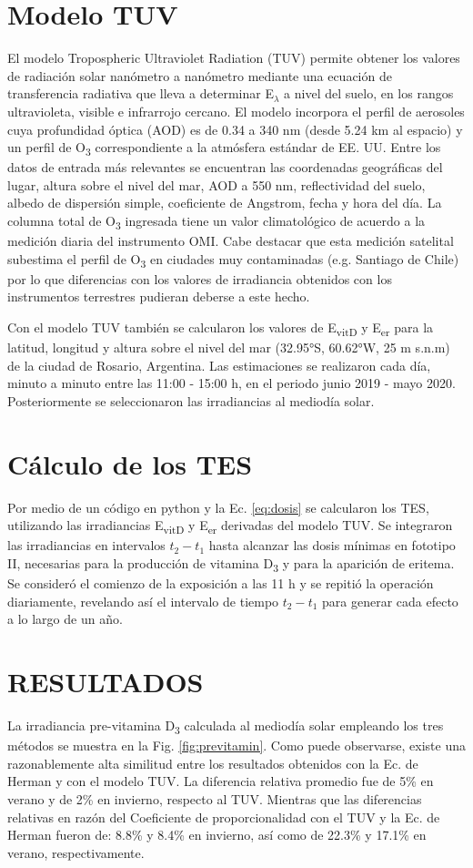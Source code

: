 \documentclass[10pt,twocolumn]{article}
\begin{document}
\section{Modelo TUV}
El modelo Tropospheric Ultraviolet Radiation (TUV) permite obtener los valores de radiación solar nanómetro a nanómetro mediante una ecuación de transferencia radiativa que lleva a determinar E$_\lambda$ a nivel del suelo, en los rangos ultravioleta, visible e infrarrojo cercano. El modelo incorpora el perfil de aerosoles cuya profundidad óptica (AOD) es de 0.34 a 340 nm (desde 5.24 km al espacio) y un perfil de O\textsubscript{3} correspondiente a la atmósfera estándar de EE. UU. Entre los datos de entrada más relevantes se encuentran las coordenadas geográficas del lugar, altura sobre el nivel del mar, AOD a 550 nm, reflectividad del suelo, albedo de dispersión simple, coeficiente de Angstrom, fecha y hora del día. La columna total de O\textsubscript{3} ingresada tiene un valor climatológico de acuerdo a la medición diaria del instrumento OMI. Cabe destacar que esta medición satelital subestima el perfil de O\textsubscript{3} en ciudades muy contaminadas (e.g. Santiago de Chile) por lo que diferencias con los valores de irradiancia obtenidos con los instrumentos terrestres pudieran deberse a este hecho.

Con el modelo TUV también se calcularon los valores de E\textsubscript{vitD} y E\textsubscript{er} para la latitud, longitud y altura sobre el nivel del mar (32.95°S, 60.62°W, 25 m s.n.m) de la ciudad de Rosario, Argentina. Las estimaciones se realizaron cada día, minuto a minuto entre las 11:00 - 15:00 h, en el periodo junio 2019 - mayo 2020. Posteriormente se seleccionaron las irradiancias al mediodía solar.

\section{Cálculo de los TES}
Por medio de un código en python y la Ec. \ref{eq:dosis} se calcularon los TES, utilizando las irradiancias E\textsubscript{vitD} y E\textsubscript{er} derivadas del modelo TUV. Se integraron las irradiancias en intervalos $t_2-t_1$ hasta alcanzar las dosis mínimas en fototipo II, necesarias para la producción de vitamina D\textsubscript{3} y para la aparición de eritema. Se consideró el comienzo de la exposición a las 11 h y se repitió la operación diariamente, revelando así el intervalo de tiempo $t_2-t_1$ para generar cada efecto a lo largo de un año.

\section{RESULTADOS}
La irradiancia pre-vitamina D\textsubscript{3} calculada al mediodía solar empleando los tres métodos se muestra en la Fig. \ref{fig:previtamin}. Como puede observarse, existe una razonablemente alta similitud entre los resultados obtenidos con la Ec. de Herman y con el modelo TUV. La diferencia relativa promedio fue de 5\% en verano y de 2\% en invierno, respecto al TUV. Mientras que las diferencias relativas en razón del Coeficiente de proporcionalidad con el TUV y la Ec. de Herman fueron de: 8.8\% y 8.4\% en invierno, así como de 22.3\% y 17.1\% en verano, respectivamente.
\end{document}
